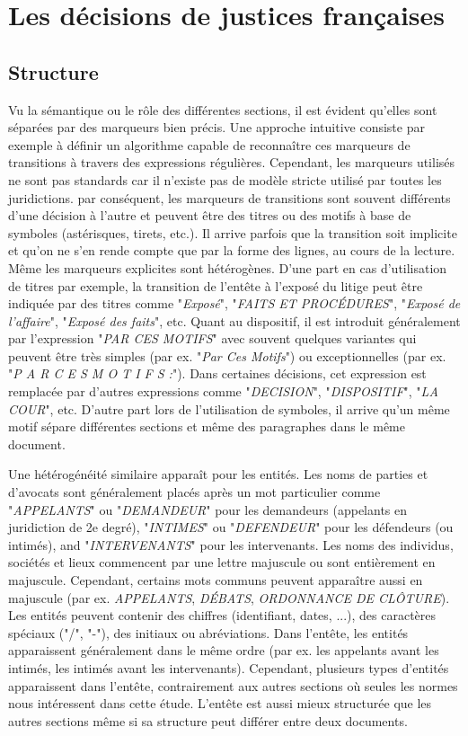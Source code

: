 \section{Les décisions de justices françaises}
\label{sec:structuration:probleme}
\subsection{Structure}
Vu la sémantique ou le rôle des différentes sections, il est évident qu'elles sont séparées par des marqueurs bien précis. Une approche intuitive consiste par exemple à définir un algorithme capable de reconnaître ces marqueurs de transitions à travers des expressions régulières. Cependant, les marqueurs utilisés ne sont pas standards car il n'existe pas de modèle stricte utilisé par toutes les juridictions. par conséquent, les marqueurs de transitions sont souvent différents d'une décision à l'autre et peuvent être des titres ou des motifs à base de symboles (astérisques, tirets, etc.). Il arrive parfois que la transition soit implicite et qu'on ne s'en rende compte que par la forme des lignes, au cours de la lecture. Même les marqueurs explicites sont hétérogènes. D'une part en cas d'utilisation de titres par exemple, la transition de l'entête à l'exposé du litige peut être indiquée par des titres comme "\textit{Exposé}", "\textit{FAITS ET PROCÉDURES}", "\textit{Exposé de l’affaire}", "\textit{Exposé des faits}", etc. Quant au dispositif, il est introduit généralement par l'expression "\textit{PAR CES MOTIFS}" avec souvent quelques variantes qui peuvent être très simples (par ex. "\textit{Par Ces Motifs}") ou exceptionnelles (par ex. "\textit{P A R C E S M O T I F S :}"). Dans certaines décisions, cet expression est remplacée par d'autres expressions comme "\textit{DECISION}", "\textit{DISPOSITIF}", "\textit{LA COUR}", etc. 
D'autre part lors de l'utilisation de symboles, il arrive qu'un même motif sépare différentes sections et même des paragraphes dans le même document.

Une hétérogénéité similaire apparaît pour les entités. Les noms de parties et d'avocats sont généralement placés après un mot particulier comme  "\textit{APPELANTS}" ou "\textit{DEMANDEUR}" pour les demandeurs (appelants en juridiction de 2e degré), "\textit{INTIMES}" ou "\textit{DEFENDEUR}" pour les défendeurs (ou intimés), and "\textit{INTERVENANTS}" pour les intervenants. Les noms des individus, sociétés et lieux commencent par une lettre majuscule ou sont entièrement en majuscule. Cependant, certains mots communs peuvent apparaître aussi en majuscule (par ex. \textit{APPELANTS}, \textit{DÉBATS}, \textit{ORDONNANCE DE CLÔTURE}). Les entités peuvent contenir des chiffres (identifiant, dates, ...), des caractères spéciaux ("/", "-"), des initiaux ou abréviations.  Dans l'entête, les entités apparaissent généralement dans le même ordre (par ex. les appelants avant les intimés, les intimés avant les intervenants). Cependant, plusieurs types d'entités apparaissent dans l'entête, contrairement aux autres sections où seules les normes nous intéressent dans cette étude. L'entête est aussi mieux structurée que les autres sections même si sa structure peut différer entre deux documents.

